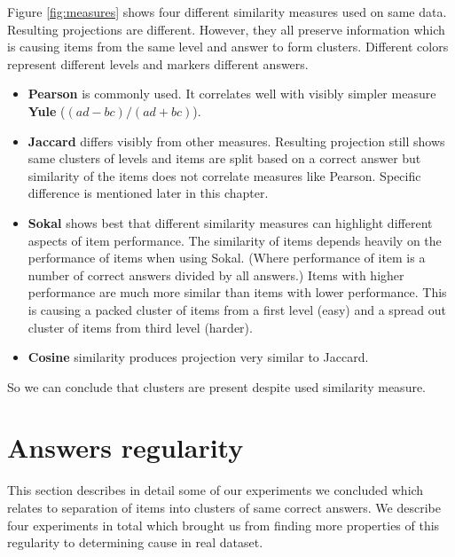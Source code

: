 \documentclass[
  digital, %
  table,   %
  nolof,     %
  nolot,     %
  nocover,
  color
]{fithesis3}
\begin{document}

Figure \ref{fig:measures} shows four different similarity measures used on same data. Resulting projections are different. However, they all preserve information which is causing items from the same level and answer to form clusters. Different colors represent different levels and markers different answers.

\begin{itemize}
\item
  \textbf{Pearson} is commonly used. It correlates well with visibly simpler measure \textbf{Yule} ($(ad-bc)/(ad+bc)$).

\item
  \textbf{Jaccard} differs visibly from other measures. Resulting projection still shows same clusters of levels and items are split based on a correct answer but similarity of the items does not correlate measures like Pearson. Specific difference is mentioned later in this chapter.

\item
  \textbf{Sokal} shows best that different similarity measures can highlight different aspects of item performance. The similarity of items depends heavily on the performance of items when using Sokal. (Where performance of item is a number of correct answers divided by all answers.) Items with higher performance are much more similar than items with lower performance. This is causing a packed cluster of items from a first level (easy) and a spread out cluster of items from third level (harder).

\item
  \textbf{Cosine} similarity produces projection very similar to Jaccard.
\end{itemize}

So we can conclude that clusters are present despite used similarity measure.


\section{Answers regularity}\label{evaulation-answers-regularity}

This section describes in detail some of our experiments we concluded which relates to separation of items into clusters of same correct answers. We describe four experiments in total which brought us from finding more properties of this regularity to determining cause in real dataset.
\end{document}
